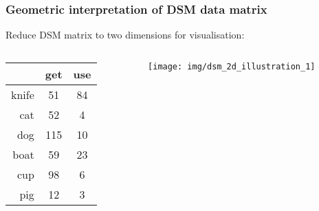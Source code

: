 \begin{frame}
  \frametitle{Geometric interpretation of DSM data matrix}

  Reduce DSM matrix to two dimensions for visualisation:

  \gap[1]
  \begin{columns}[c]
    \begin{column}{3cm}
      \begin{tabular}{r | cc}
          &  get & use  \\
    \midrule
    knife &  51  & 84   \\
    cat   &  52  &  4   \\
    dog   & 115  & 10   \\
    boat  &  59  & 23   \\
    cup   &  98  &  6   \\
    pig   &  12  &  3 
      \end{tabular}
    \end{column}
    \begin{column}{6cm}
      \texttt{[image: img/dsm\_2d\_illustration\_1]}
    \end{column}
  \end{columns}
\end{frame}


